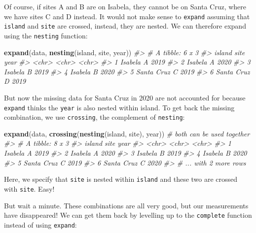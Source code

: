 \documentclass[]{book}
\newenvironment{Shaded}{}{}
\newcommand{\CommentTok}[1]{\textcolor[rgb]{0.38,0.63,0.69}{\textit{#1}}}
\newcommand{\KeywordTok}[1]{\textcolor[rgb]{0.00,0.44,0.13}{\textbf{#1}}}
\newcommand{\NormalTok}[1]{#1}
\begin{document}
Of course, if sites A and B are on Isabela, they cannot be on Santa Cruz, where we have sites C and D instead. It would not make sense to \texttt{expand} assuming that \texttt{island} and \texttt{site} are crossed, instead, they are nested. We can therefore expand using the \texttt{nesting} function:

\begin{Shaded}
\begin{Highlighting}[]
\KeywordTok{expand}\NormalTok{(data, }\KeywordTok{nesting}\NormalTok{(island, site, year))}
\CommentTok{#> # A tibble: 6 x 3}
\CommentTok{#>   island     site  year }
\CommentTok{#>   <chr>      <chr> <chr>}
\CommentTok{#> 1 Isabela    A     2019 }
\CommentTok{#> 2 Isabela    A     2020 }
\CommentTok{#> 3 Isabela    B     2019 }
\CommentTok{#> 4 Isabela    B     2020 }
\CommentTok{#> 5 Santa Cruz C     2019 }
\CommentTok{#> 6 Santa Cruz D     2019}
\end{Highlighting}
\end{Shaded}

But now the missing data for Santa Cruz in 2020 are not accounted for because \texttt{expand} thinks the \texttt{year} is also nested within island. To get back the missing combination, we use \texttt{crossing}, the complement of \texttt{nesting}:

\begin{Shaded}
\begin{Highlighting}[]
\KeywordTok{expand}\NormalTok{(data, }\KeywordTok{crossing}\NormalTok{(}\KeywordTok{nesting}\NormalTok{(island, site), year)) }\CommentTok{# both can be used together}
\CommentTok{#> # A tibble: 8 x 3}
\CommentTok{#>   island     site  year }
\CommentTok{#>   <chr>      <chr> <chr>}
\CommentTok{#> 1 Isabela    A     2019 }
\CommentTok{#> 2 Isabela    A     2020 }
\CommentTok{#> 3 Isabela    B     2019 }
\CommentTok{#> 4 Isabela    B     2020 }
\CommentTok{#> 5 Santa Cruz C     2019 }
\CommentTok{#> 6 Santa Cruz C     2020 }
\CommentTok{#> # ... with 2 more rows}
\end{Highlighting}
\end{Shaded}

Here, we specify that \texttt{site} is nested within \texttt{island} and these two are crossed with \texttt{site}. Easy!

But wait a minute. These combinations are all very good, but our measurements have disappeared! We can get them back by levelling up to the \texttt{complete} function instead of using \texttt{expand}:
\end{document}

